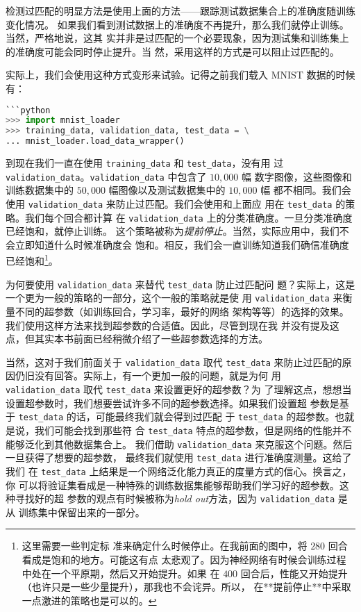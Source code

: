 检测过匹配的明显方法是使用上面的方法——跟踪测试数据集合上的准确度随训练变化情况。
如果我们看到测试数据上的准确度不再提升，那么我们就停止训练。当然，严格地说，这其
实并非是过匹配的一个必要现象，因为测试集和训练集上的准确度可能会同时停止提升。当
然，采用这样的方式是可以阻止过匹配的。

实际上，我们会使用这种方式变形来试验。记得之前我们载入 MNIST 数据的时候有：

\begin{lstlisting}[language=Python]
```python 
>>> import mnist_loader 
>>> training_data, validation_data, test_data = \
... mnist_loader.load_data_wrapper()
\end{lstlisting}

到现在我们一直在使用 \lstinline!training_data! 和 \lstinline!test_data!，没有用
过 \lstinline!validation_data!。\lstinline!validation_data! 中包含了 $10,000$ 幅
数字图像，这些图像和训练数据集中的 $50,000$ 幅图像以及测试数据集中的 $10,000$ 幅
都不相同。我们会使用 \lstinline!validation_data! 来防止过匹配。我们会使用和上面应
用在 \lstinline!test_data! 的策略。我们每个回合都计算
在 \lstinline!validation_data! 上的分类准确度。一旦分类准确度已经饱和，就停止训练。
这个策略被称为\emph{提前停止}。当然，实际应用中，我们不会立即知道什么时候准确度会
饱和。相反，我们会一直训练知道我们确信准确度已经饱和\footnote{这里需要一些判定标
  准来确定什么时候停止。在我前面的图中，将 $280$ 回合看成是饱和的地方。可能这有点
  太悲观了。因为神经网络有时候会训练过程中处在一个平原期，然后又开始提升。如果
  在 $400$ 回合后，性能又开始提升（也许只是一些少量提升），那我也不会诧异。所以，
  在**提前停止**中采取一点激进的策略也是可以的。}。

为何要使用 \lstinline!validation_data! 来替代 \lstinline!test_data! 防止过匹配问
题？实际上，这是一个更为一般的策略的一部分，这个一般的策略就是使
用 \lstinline!validation_data! 来衡量不同的超参数（如训练回合，学习率，最好的网络
架构等等）的选择的效果。我们使用这样方法来找到超参数的合适值。因此，尽管到现在我
并没有提及这点，但其实本书前面已经稍微介绍了一些超参数选择的方法。

当然，这对于我们前面关于 \lstinline!validation_data! 取代 \lstinline!test_data!
来防止过匹配的原因仍旧没有回答。实际上，有一个更加一般的问题，就是为何
用 \lstinline!validation_data! 取代 \lstinline!test_data! 来设置更好的超参数？为
了理解这点，想想当设置超参数时，我们想要尝试许多不同的超参数选择。如果我们设置超
参数是基于 \lstinline!test_data! 的话，可能最终我们就会得到过匹配
于 \lstinline!test_data!  的超参数。也就是说，我们可能会找到那些符
合 \lstinline!test_data! 特点的超参数，但是网络的性能并不能够泛化到其他数据集合上。
我们借助 \lstinline!validation_data! 来克服这个问题。然后一旦获得了想要的超参数，
最终我们就使用 \lstinline!test_data! 进行准确度测量。这给了我们
在 \lstinline!test_data! 上结果是一个网络泛化能力真正的度量方式的信心。换言之，你
可以将验证集看成是一种特殊的训练数据集能够帮助我们学习好的超参数。这种寻找好的超
参数的观点有时候被称为\emph{hold out}方法，因为 \lstinline!validation_data! 是从
训练集中保留出来的一部分。

